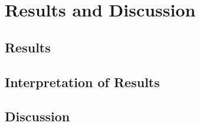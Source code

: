 \chapter{Results and Discussion}
\label{chap:kapitel5}

	\section{Results}
	\label{sec:results}



	\section{Interpretation of Results}
	\label{sec:interpretation-of-results}
	
	
	
	
	
	
	\section{Discussion} %
	\label{sec:doscussion}
	
	
	\iffalse
	Diskussion - Bias Experiment: In the bias experiment it is difficult to say if a prediction is biased towards texture or shape. All confusing data is only confusing on texture level, so a texture biased model should perform poorly in comparison to a shape biased model. But also a shape biased model will use texture information and the question is how much and how the impact really is. In addition there are other influences, like amount of objects per scene, brightness, reflective texture, novel texture, novel shape and all of these can influence the result. -> my opinion? what does the results look like?
	It seems like that there are learned shape and texture dependent decisions
	\fi
	
	
	








